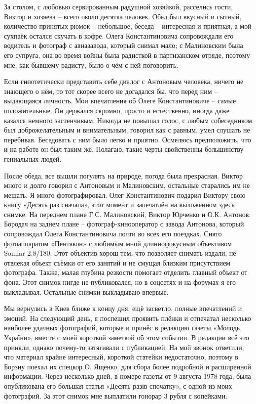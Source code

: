 За столом, с любовью сервированным радушной хозяйкой, расселись гости, Виктор и
хозяева – всего около десятка человек. Обед был вкусный и сытный, количество
принятых рюмок – небольшое, беседа – интересная и приятная, а мой сухпаёк
остался скучать в кофре. Олега Константиновича сопровождали его водитель и
фотограф с авиазавода, который снимал мало; с Малиновским была его супруга, она
во время войны была радисткой в партизанском отряде, поэтому мне, как бывшему
радисту, было о чём с ней поговорить.

Если гипотетически представить себе диалог с Антоновым человека, ничего не
знающего о нём, то тот скорее всего не догадался бы, что перед ним – выдающаяся
личность. Мои впечатления об Олеге Константиновиче – самые положительные. Он
держался скромно, просто и естественно, иногда даже казался немного
застенчивым. Никогда не повышал голос, с любым собеседником был
доброжелательным и внимательным, говорил как с равным, умел слушать не
перебивая. Беседовать с ним было легко и приятно. Осмелюсь предположить, что и
на работе он был таким же. Полагаю, такие черты свойственны большинству
гениальных людей.

После обеда, все вышли погулять на природе, погода была прекрасная. Виктор
много и долго говорил с Антоновым и Малиновским, остальные старались им не
мешать. Я много фотографировал. Олег Константинович подарил Виктору свою книгу
«Десять раз сначала», этот момент и запечатлён на выложенном здесь снимке. На
переднем плане Г.С. Малиновский, Виктор Юрченко и О.К. Антонов. Бородач на
заднем плане – фотограф-кинооператор с завода Антонова, который сопровождал
Олега Константиновича почти во всех его поездках. Снято фотоаппаратом
«Пентакон» с любимым мной длиннофокусным объективом Sonnar 2,8/180. Этот
объектив хорош тем, что позволяет снимать издали, не отвлекая объект съёмки от
его занятий и не смущая близким присутствием фотографа. Также, малая глубина
резкости помогает отделить главный объект от фона. Этот снимок нигде не
публиковался, но в соцсетях и на форумах я его выкладывал. Остальные снимки
выкладываю впервые.

Мы вернулись в Киев ближе к концу дня, ещё засветло, полные впечатлений и
эмоций. На следующий день, я поспешил проявить плёнки и отпечатал несколько
наиболее удачных фотографий, которые и принёс в редакцию газеты «Молодь
України», вместе с моей короткой заметкой об этом событии. В редакции всё это
приняли, однако почему-то затягивали с публикацией. На мой звонок ответили, что
материал крайне интересный, короткой статейки недостаточно, поэтому в Борзну
поехал их спецкор О. Ященко, для сбора более подробной и расширенной
информации. Через несколько дней, в номере газеты от 9 августа 1978 года, была
опубликована его большая статья «Десять разів спочатку», с одной из моих
фотографий. За этот снимок мне выплатили гонорар 3 рубля с копейками.

